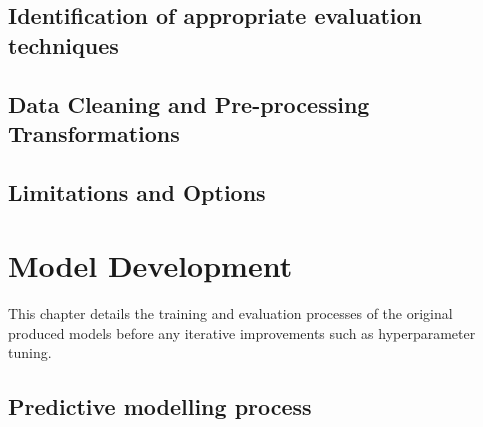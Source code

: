 \documentclass[12pt]{report}
\begin{document}
\section{Identification of appropriate evaluation techniques}

\section{Data Cleaning and Pre-processing Transformations}\label{sec:Preprocessing}

\section{Limitations and Options}


\chapter{Model Development} %
This chapter details the training and evaluation processes of the original produced models
before any iterative improvements such as hyperparameter tuning.

\section{Predictive modelling process}
\end{document}
